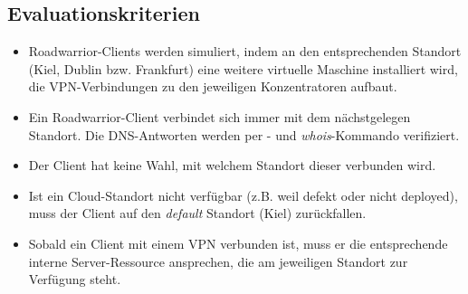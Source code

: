 \subsection{Evaluationskriterien}
\begin{itemize}
\item Roadwarrior-Clients werden simuliert, indem an den entsprechenden Standort (Kiel, Dublin bzw. Frankfurt) eine weitere virtuelle Maschine installiert wird, die VPN-Verbindungen zu den jeweiligen Konzentratoren aufbaut.
\item Ein Roadwarrior-Client verbindet sich immer mit dem nächstgelegen Standort. Die DNS-Antworten werden per - und \textit{whois}-Kommando verifiziert.
\item Der Client hat keine Wahl, mit welchem Standort dieser verbunden wird.
\item Ist ein Cloud-Standort nicht verfügbar (z.B. weil defekt oder nicht deployed), muss der Client auf den \textit{default} Standort (Kiel) zurückfallen.
\item Sobald ein Client mit einem VPN verbunden ist, muss er die entsprechende interne Server-Ressource ansprechen, die am jeweiligen Standort zur Verfügung steht.
\end{itemize}
